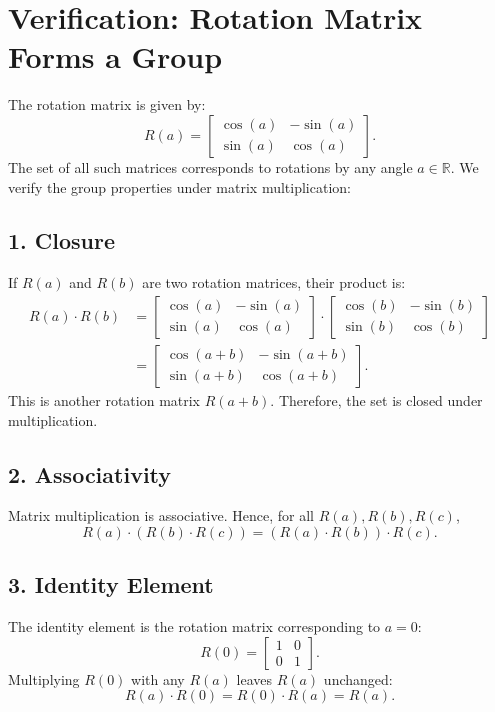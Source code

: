 \documentclass{article}
\begin{document}
\section*{Verification: Rotation Matrix Forms a Group}

The rotation matrix is given by:
\begin{equation}
R(a) = \begin{bmatrix}
\cos(a) & -\sin(a) \\
\sin(a) & \cos(a)
\end{bmatrix}.
\end{equation}
The set of all such matrices corresponds to rotations by any angle \(a \in \mathbb{R}\). We verify the group properties under matrix multiplication:

\subsection*{1. Closure}
If \( R(a) \) and \( R(b) \) are two rotation matrices, their product is:
\begin{align*}
R(a) \cdot R(b) &= \begin{bmatrix}
\cos(a) & -\sin(a) \\
\sin(a) & \cos(a)
\end{bmatrix}
\cdot
\begin{bmatrix}
\cos(b) & -\sin(b) \\
\sin(b) & \cos(b)
\end{bmatrix} \\
&= \begin{bmatrix}
\cos(a+b) & -\sin(a+b) \\
\sin(a+b) & \cos(a+b)
\end{bmatrix}.
\end{align*}
This is another rotation matrix \( R(a+b) \). Therefore, the set is closed under multiplication.

\subsection*{2. Associativity}
Matrix multiplication is associative. Hence, for all \( R(a), R(b), R(c) \),
\begin{equation}
R(a) \cdot (R(b) \cdot R(c)) = (R(a) \cdot R(b)) \cdot R(c).
\end{equation}

\subsection*{3. Identity Element}
The identity element is the rotation matrix corresponding to \(a = 0\):
\begin{equation}
R(0) = \begin{bmatrix}
1 & 0 \\
0 & 1
\end{bmatrix}.
\end{equation}
Multiplying \( R(0) \) with any \( R(a) \) leaves \( R(a) \) unchanged:
\begin{equation}
R(a) \cdot R(0) = R(0) \cdot R(a) = R(a).
\end{equation}
\end{document}
